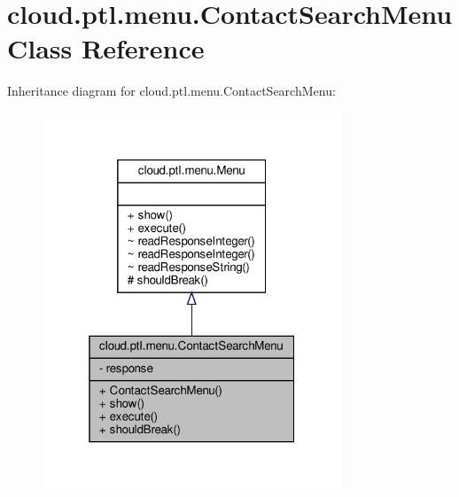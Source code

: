 \hypertarget{classcloud_1_1ptl_1_1menu_1_1ContactSearchMenu}{}\section{cloud.\+ptl.\+menu.\+Contact\+Search\+Menu Class Reference}
\label{classcloud_1_1ptl_1_1menu_1_1ContactSearchMenu}


Inheritance diagram for cloud.\+ptl.\+menu.\+Contact\+Search\+Menu\+:
\nopagebreak
\begin{figure}[H]
\begin{center}
\leavevmode
\includegraphics[width=253pt]{classcloud_1_1ptl_1_1menu_1_1ContactSearchMenu__inherit__graph}
\end{center}
\end{figure}


